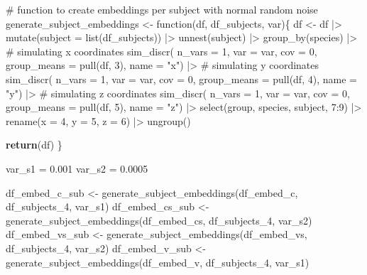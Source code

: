 \documentclass[
  authoryear]{elsarticle}
\newenvironment{Shaded}{\begin{snugshade}}{\end{snugshade}}
\newcommand{\BuiltInTok}[1]{\textcolor[rgb]{0.00,0.23,0.31}{#1}}
\newcommand{\CommentTok}[1]{\textcolor[rgb]{0.37,0.37,0.37}{#1}}
\newcommand{\ControlFlowTok}[1]{\textcolor[rgb]{0.00,0.23,0.31}{\textbf{#1}}}
\newcommand{\DecValTok}[1]{\textcolor[rgb]{0.68,0.00,0.00}{#1}}
\newcommand{\FloatTok}[1]{\textcolor[rgb]{0.68,0.00,0.00}{#1}}
\newcommand{\NormalTok}[1]{\textcolor[rgb]{0.00,0.23,0.31}{#1}}
\newcommand{\OperatorTok}[1]{\textcolor[rgb]{0.37,0.37,0.37}{#1}}
\newcommand{\StringTok}[1]{\textcolor[rgb]{0.13,0.47,0.30}{#1}}
\begin{document}
\begin{Shaded}
\begin{Highlighting}[]
\CommentTok{\# function to create embeddings per subject with normal random noise}
\NormalTok{generate\_subject\_embeddings }\OperatorTok{\textless{}{-}}\NormalTok{ function(df, df\_subjects, var)\{}
\NormalTok{  df }\OperatorTok{\textless{}{-}}
\NormalTok{    df }\OperatorTok{|\textgreater{}} 
\NormalTok{    mutate(subject }\OperatorTok{=} \BuiltInTok{list}\NormalTok{(df\_subjects)) }\OperatorTok{|\textgreater{}} 
\NormalTok{    unnest(subject) }\OperatorTok{|\textgreater{}} 
\NormalTok{    group\_by(species) }\OperatorTok{|\textgreater{}} 
    \CommentTok{\# simulating x coordinates}
\NormalTok{    sim\_discr(}
\NormalTok{      n\_vars }\OperatorTok{=} \DecValTok{1}\NormalTok{, }
\NormalTok{      var }\OperatorTok{=}\NormalTok{ var, }
\NormalTok{      cov }\OperatorTok{=} \DecValTok{0}\NormalTok{, }
\NormalTok{      group\_means }\OperatorTok{=}\NormalTok{ pull(df, }\DecValTok{3}\NormalTok{), }
\NormalTok{      name }\OperatorTok{=} \StringTok{"x"}\NormalTok{) }\OperatorTok{|\textgreater{}} 
    \CommentTok{\# simulating y coordinates}
\NormalTok{    sim\_discr(}
\NormalTok{      n\_vars }\OperatorTok{=} \DecValTok{1}\NormalTok{, }
\NormalTok{      var }\OperatorTok{=}\NormalTok{ var, }
\NormalTok{      cov }\OperatorTok{=} \DecValTok{0}\NormalTok{, }
\NormalTok{      group\_means }\OperatorTok{=}\NormalTok{ pull(df, }\DecValTok{4}\NormalTok{), }
\NormalTok{      name }\OperatorTok{=} \StringTok{"y"}\NormalTok{) }\OperatorTok{|\textgreater{}} 
    \CommentTok{\# simulating z coordinates}
\NormalTok{    sim\_discr(}
\NormalTok{      n\_vars }\OperatorTok{=} \DecValTok{1}\NormalTok{, }
\NormalTok{      var }\OperatorTok{=}\NormalTok{ var, }
\NormalTok{      cov }\OperatorTok{=} \DecValTok{0}\NormalTok{, }
\NormalTok{      group\_means }\OperatorTok{=}\NormalTok{ pull(df, }\DecValTok{5}\NormalTok{), }
\NormalTok{      name }\OperatorTok{=} \StringTok{"z"}\NormalTok{) }\OperatorTok{|\textgreater{}}
\NormalTok{  select(group, species, subject, }\DecValTok{7}\NormalTok{:}\DecValTok{9}\NormalTok{) }\OperatorTok{|\textgreater{}} 
\NormalTok{  rename(x }\OperatorTok{=} \DecValTok{4}\NormalTok{, y }\OperatorTok{=} \DecValTok{5}\NormalTok{, z }\OperatorTok{=} \DecValTok{6}\NormalTok{) }\OperatorTok{|\textgreater{}} 
\NormalTok{  ungroup()}
  
  \ControlFlowTok{return}\NormalTok{(df)}
\NormalTok{\}}

\NormalTok{var\_s1 }\OperatorTok{=} \FloatTok{0.001}
\NormalTok{var\_s2 }\OperatorTok{=} \FloatTok{0.0005}

\NormalTok{df\_embed\_c\_sub  }\OperatorTok{\textless{}{-}}\NormalTok{ generate\_subject\_embeddings(df\_embed\_c,  df\_subjects\_4, var\_s1)}
\NormalTok{df\_embed\_cs\_sub }\OperatorTok{\textless{}{-}}\NormalTok{ generate\_subject\_embeddings(df\_embed\_cs, df\_subjects\_4, var\_s2)}
\NormalTok{df\_embed\_vs\_sub }\OperatorTok{\textless{}{-}}\NormalTok{ generate\_subject\_embeddings(df\_embed\_vs, df\_subjects\_4, var\_s2)}
\NormalTok{df\_embed\_v\_sub  }\OperatorTok{\textless{}{-}}\NormalTok{ generate\_subject\_embeddings(df\_embed\_v,  df\_subjects\_4, var\_s1)}
\end{Highlighting}
\end{Shaded}
\end{document}
